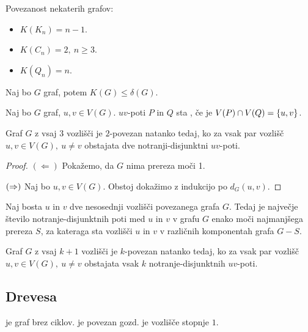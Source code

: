 \begin{primer}
    Povezanost nekaterih grafov:
    \begin{itemize}
        \item $K(K_n) = n-1$.
        \item $K(C_n) = 2, \ n \geq 3$.
        \item $K(Q_n) = n$.
    \end{itemize}
\end{primer}

\begin{opomba}
    Naj bo $G$ graf, potem $K(G) \leq \delta(G)$.
\end{opomba}

\begin{definicija}
    Naj bo $G$ graf, $u,v \in V(G)$. $uv$-poti $P$ in $Q$ sta , če je $V(P) \cap V(Q) = \left\{u,v\right\}$.
\end{definicija}

\begin{izrek}[Whitney]
    Graf $G$ z vsaj \(3\) vozlišči je $2$-povezan natanko tedaj, ko za vsak par vozlišč $u, v \in V(G), \ u \neq v$ obstajata dve notranji-disjunktni $uv$-poti.
\end{izrek}

\begin{proof}
    $(\Leftarrow)$ Pokažemo, da $G$ nima prereza moči 1.

    $(\Rightarrow)$ Naj bo $u,v \in V(G)$. Obstoj dokažimo z indukcijo po $d_G(u,v)$.
\end{proof}

\begin{izrek}[Menger]
    Naj bosta \(u\) in \(v\) dve nesosednji vozlišči povezanega grafa \(G\). Tedaj je največje število notranje-disjunktnih poti med \(u\) in \(v\) v grafu \(G\) enako moči najmanjšega prereza \(S\), za kateraga sta vozlišči \(u\) in \(v\) v različnih komponentah grafa \(G - S\).
\end{izrek}

\begin{posledica}
    Graf $G$ z vsaj \(k+1\) vozlišči je $k$-povezan natanko tedaj, ko za vsak par vozlišč $u, v \in V(G), \ u \neq v$ obstajata vsak \(k\) notranje-disjunktnih $uv$-poti.
\end{posledica}

\newpage
\subsection{Drevesa}
\begin{definicija}
     je graf brez ciklov.  je povezan gozd.  je vozlišče stopnje $1$.
\end{definicija}

